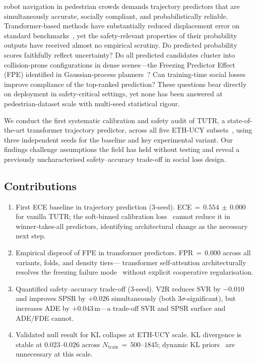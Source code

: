 \documentclass[journal]{IEEEtran}
\begin{document}
 robot navigation in pedestrian crowds demands
trajectory predictors that are simultaneously accurate, socially
compliant, and probabilistically reliable.
Transformer-based methods have substantially reduced displacement error
on standard benchmarks~\cite{shi2023tutr,mohamed2020social}, yet the
safety-relevant properties of their probability outputs have received
almost no empirical scrutiny.
Do predicted probability scores faithfully reflect uncertainty?
Do all predicted candidates cluster into collision-prone configurations
in dense scenes---the Freezing Predictor Effect (FPE) identified in
Gaussian-process planners~\cite{trautman2010unfreezing}?
Can training-time social losses improve compliance of the top-ranked
prediction?
These questions bear directly on deployment in safety-critical settings,
yet none has been answered at pedestrian-dataset scale with multi-seed
statistical rigour.

We conduct the first systematic calibration and safety audit of TUTR,
a state-of-the-art transformer trajectory predictor, across all five
ETH-UCY subsets~\cite{pellegrini2009eth,lerner2007ucy}, using three
independent seeds for the baseline and key experimental variant.
Our findings challenge assumptions the field has held without testing
and reveal a previously uncharacterised safety--accuracy trade-off in
social loss design.

\subsection*{Contributions}

\begin{enumerate}

\item First ECE baseline in trajectory prediction (3-seed).
ECE\,\(=\,0.554\,\pm\,0.000\) for vanilla TUTR; the soft-binned
calibration loss~\cite{karandikar2021soft} cannot reduce it in
winner-takes-all predictors, identifying architectural change as the
necessary next step.

\item Empirical disproof of FPE in transformer predictors.
FPR\,\(=\,0.000\) across all variants, folds, and density tiers---
transformer self-attention architecturally resolves the freezing
failure mode~\cite{trautman2010unfreezing} without explicit cooperative
regularisation.

\item Quantified safety--accuracy trade-off (3-seed).
V2R reduces SVR by \(-0.010\) and improves SPSR by \(+0.026\)
simultaneously (both \(3\sigma\)-significant), but increases ADE
by \(+0.043\)\,m---a trade-off SVR and SPSR surface and ADE/FDE
cannot.

\item Validated null result for KL collapse at ETH-UCY scale.
KL divergence is stable at \(0.023\)--\(0.026\) across
\(N_{\text{train}}\,{=}\,500\)--\(1845\); dynamic KL
priors~\cite{zhang2025openworld} are unnecessary at this scale.

\end{enumerate}
\end{document}
